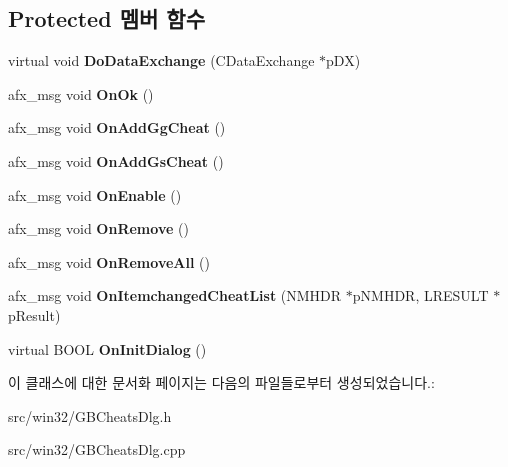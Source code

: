 \subsection*{Protected 멤버 함수}
\begin{DoxyCompactItemize}
\item 
\mbox{\label{class_g_b_cheat_list_ab521fa9ea4378fa0d15b4f61a6e7f965}} 
virtual void {\bfseries Do\+Data\+Exchange} (C\+Data\+Exchange $\ast$p\+DX)
\item 
\mbox{\label{class_g_b_cheat_list_a354069c10c3804094ce2b4079588115e}} 
afx\+\_\+msg void {\bfseries On\+Ok} ()
\item 
\mbox{\label{class_g_b_cheat_list_a9bb70cfb03b60aae7f599000144df75e}} 
afx\+\_\+msg void {\bfseries On\+Add\+Gg\+Cheat} ()
\item 
\mbox{\label{class_g_b_cheat_list_a50f8baaa9c1fc25bbddc698d1679b4c3}} 
afx\+\_\+msg void {\bfseries On\+Add\+Gs\+Cheat} ()
\item 
\mbox{\label{class_g_b_cheat_list_a3a9af133cd9547881b6f71404ab9171f}} 
afx\+\_\+msg void {\bfseries On\+Enable} ()
\item 
\mbox{\label{class_g_b_cheat_list_ae8c2c668dbb6ab9989c50efc60448a54}} 
afx\+\_\+msg void {\bfseries On\+Remove} ()
\item 
\mbox{\label{class_g_b_cheat_list_a572e8d726efb4dcaed99de7b7f1a815d}} 
afx\+\_\+msg void {\bfseries On\+Remove\+All} ()
\item 
\mbox{\label{class_g_b_cheat_list_a35c4625f3b1696bf7647d23831ae310b}} 
afx\+\_\+msg void {\bfseries On\+Itemchanged\+Cheat\+List} (N\+M\+H\+DR $\ast$p\+N\+M\+H\+DR, L\+R\+E\+S\+U\+LT $\ast$p\+Result)
\item 
\mbox{\label{class_g_b_cheat_list_a3adbb125356d48a379d2e60609fb775f}} 
virtual B\+O\+OL {\bfseries On\+Init\+Dialog} ()
\end{DoxyCompactItemize}


이 클래스에 대한 문서화 페이지는 다음의 파일들로부터 생성되었습니다.\+:\begin{DoxyCompactItemize}
\item 
src/win32/G\+B\+Cheats\+Dlg.\+h\item 
src/win32/G\+B\+Cheats\+Dlg.\+cpp\end{DoxyCompactItemize}
